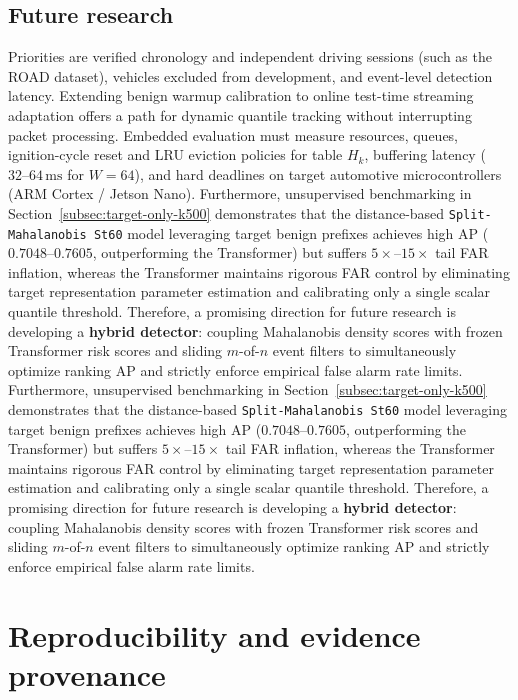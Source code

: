\documentclass[12pt, a4paper, reqno, oneside]{book}
\newcommand\sect[1]{%
  \Needspace{5\baselineskip}%
  \phantomsection%
  \addcontentsline{toc}{section}{#1}%
  \section*{#1}%
}
\DeclareRobustCommand{\code}[1]{\nolinkurl{#1}}
\begin{document}
\sect{Future research}
Priorities are verified chronology and independent driving sessions (such as the ROAD dataset), vehicles excluded from development, and event-level detection latency. Extending benign warmup calibration to online test-time streaming adaptation offers a path for dynamic quantile tracking without interrupting packet processing. Embedded evaluation must measure resources, queues, ignition-cycle reset and LRU eviction policies for table $H_k$, buffering latency ($32\text{--}64\,\text{ms}$ for $W=64$), and hard deadlines on target automotive microcontrollers (ARM Cortex / Jetson Nano). Furthermore, unsupervised benchmarking in Section~\ref{subsec:target-only-k500} demonstrates that the distance-based \code{Split-Mahalanobis St60} model leveraging target benign prefixes achieves high AP ($0.7048\text{--}0.7605$, outperforming the Transformer) but suffers $5\times\text{--}15\times$ tail FAR inflation, whereas the Transformer maintains rigorous FAR control by eliminating target representation parameter estimation and calibrating only a single scalar quantile threshold. Therefore, a promising direction for future research is developing a \textbf{hybrid detector}: coupling Mahalanobis density scores with frozen Transformer risk scores and sliding $m$-of-$n$ event filters to simultaneously optimize ranking AP and strictly enforce empirical false alarm rate limits. Furthermore, unsupervised benchmarking in Section~\ref{subsec:target-only-k500} demonstrates that the distance-based \code{Split-Mahalanobis St60} model leveraging target benign prefixes achieves high AP ($0.7048\text{--}0.7605$, outperforming the Transformer) but suffers $5\times\text{--}15\times$ tail FAR inflation, whereas the Transformer maintains rigorous FAR control by eliminating target representation parameter estimation and calibrating only a single scalar quantile threshold. Therefore, a promising direction for future research is developing a \textbf{hybrid detector}: coupling Mahalanobis density scores with frozen Transformer risk scores and sliding $m$-of-$n$ event filters to simultaneously optimize ranking AP and strictly enforce empirical false alarm rate limits.

\appendix
\chapter{Reproducibility and evidence provenance}\label{app:reproducibility}
\end{document}
